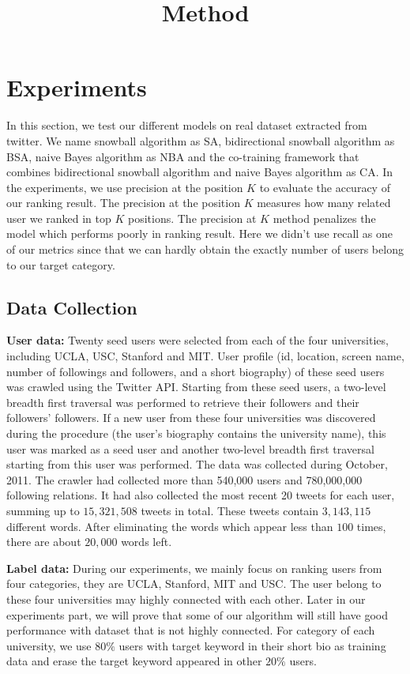\documentclass{article}
\begin{document}
\title{Method}
\maketitle \else \fi

\section{Experiments}\label{sec:experiment}
In this section, we test our different models on real dataset extracted from twitter. We name snowball algorithm as SA, bidirectional snowball algorithm as BSA, naive Bayes algorithm as NBA and the co-training framework that combines bidirectional snowball algorithm and naive Bayes algorithm as CA. In the experiments, we use precision at the position $K$ to evaluate the accuracy of our ranking result. The precision at the position $K$ measures how many related user we ranked in top $K$ positions. The precision at $K$ method penalizes the model which performs poorly in ranking result. Here we didn't use recall as one of our metrics since that we can hardly obtain the exactly number of users belong to our target category.

\subsection{Data Collection}
\textbf{User data:} Twenty seed users were selected from each of the four universities, including UCLA, USC, Stanford and MIT. User profile (id, location, screen name, number of followings and followers, and a short biography) of these seed users was crawled using the Twitter API. Starting from these seed users, a two-level breadth first traversal was performed to retrieve their followers and their followers' followers. If a new user from these four universities was discovered during the procedure (the user's biography contains the university name), this user was marked as a seed user and another two-level breadth first traversal starting from this user was performed. The data was collected during October, 2011. The crawler had collected more than 540,000 users and 780,000,000 following relations. It had also collected the most recent 20 tweets for each user, summing up to $15,321,508$ tweets in total. These tweets contain $3,143,115$ different words. After eliminating the words which appear less than $100$ times, there are about $20,000$ words left.

\textbf{Label data:} During our experiments, we mainly focus on ranking users from four categories, they are UCLA, Stanford, MIT and USC. The user belong to these four universities may highly connected with each other. Later in our experiments part, we will prove that some of our algorithm will still have good performance with dataset that is not highly connected. For category of each university, we use $80\%$ users with target keyword in their short bio as training data and erase the target keyword appeared in other $20\%$ users.
\end{document}
